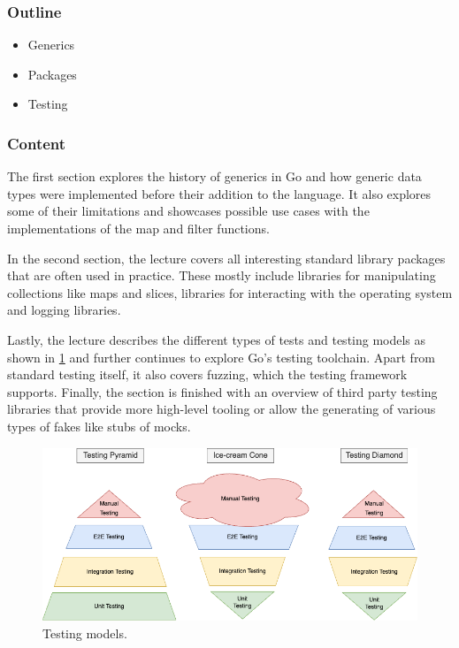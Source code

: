 \documentclass[
  digital,
  color,
  oneside,
  nosansbold,
  nocolorbold,
  nolof,
  nolot,
]{fithesis4}
\begin{document}
\subsubsection{Outline}

\begin{itemize}
    \item Generics
    \item Packages
    \item Testing
\end{itemize}

\subsubsection{Content}

The first section explores the history of generics in Go and how generic data types were implemented before their addition to the language. It also explores some of their limitations and showcases possible use cases with the implementations of the map and filter functions.

In the second section, the lecture covers all interesting standard library packages that are often used in practice. These mostly include libraries for manipulating collections like maps and slices, libraries for interacting with the operating system and logging libraries.

Lastly, the lecture describes the different types of tests and testing models as shown in \cref{fig:testing-models} and further continues to explore Go's testing toolchain. Apart from standard testing itself, it also covers fuzzing, which the testing framework supports. Finally, the section is finished with an overview of third party testing libraries that provide more high-level tooling or allow the generating of various types of fakes like stubs of mocks.

\begin{figure}[H]
    \centering
    \includegraphics[width=12cm]{figures/pyramids.png}
    \caption{Testing models.}
    \label{fig:testing-models}
\end{figure}
\end{document}
